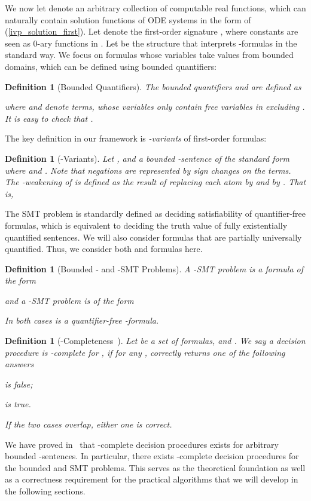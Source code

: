 \documentclass[12pt]{article}
\newtheorem{definition}[theorem]{Definition}
\begin{document}
We now let  denote an arbitrary collection of computable real functions, which can naturally contain solution functions of ODE systems in the form of (\ref{ivp_solution_first}). Let  denote the first-order signature , where constants are seen as 0-ary functions in . Let  be the  structure  that interprets -formulas in the standard way. We focus on formulas whose variables take values from bounded domains, which can be defined using bounded quantifiers:
\begin{definition}[Bounded Quantifiers]
The bounded quantifiers  and  are defined as

where  and  denote  terms, whose variables only
contain free variables in  excluding . It is easy to check that
.
\end{definition}
The key definition in our framework is {\em -variants} of first-order formulas: 
\begin{definition}[-Variants]\label{variants}
Let , and  a bounded
-sentence of the standard form
 where  and .  Note that negations are represented by sign changes on the terms. The {\em
-weakening}  of  is
defined as the result of replacing each atom  by  and  by . That is,

\end{definition}
The SMT problem is standardly defined as deciding satisfiability of quantifier-free formulas, which is equivalent to deciding the truth value of fully existentially quantified sentences. We will also consider formulas that are partially universally quantified. Thus, we consider both  and  formulas here.
\begin{definition}[Bounded - and -SMT Problems]
A -SMT problem is a formula of the form

and a -SMT problem is of the form

In both cases  is a quantifier-free -formula.
\end{definition}
\begin{definition}[-Completeness~\cite{DBLP:conf/cade/GaoAC12}]
Let  be a set of  formulas, and . We say a decision procedure  is -complete for , if for any ,  correctly returns one of the following answers

  is false;

  is true.

If the two cases overlap, either one is correct.
\end{definition}
We have proved in~\cite{DBLP:conf/lics/GaoAC12} that -complete decision procedures exists for arbitrary bounded -sentences. In particular, there exists -complete decision procedures for the bounded  and  SMT problems. This serves as the theoretical foundation as well as a correctness requirement for the practical algorithms that we will develop in the following sections.
\end{document}
